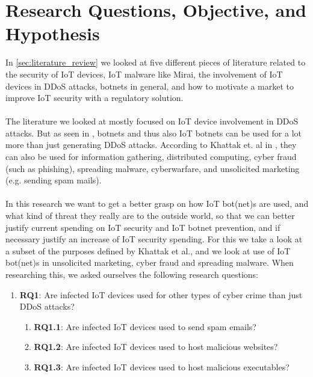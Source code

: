 \documentclass[a4paper,10pt]{article}
\begin{document}
\section{Research Questions, Objective, and Hypothesis} \label{sec:research_questions}
% 
In \autoref{sec:literature_review} we looked at five different pieces of literature related to the security of IoT 
devices, IoT malware like Mirai, the involvement of IoT devices in DDoS attacks, botnets in general, and how 
to motivate a market to improve IoT security with a regulatory solution.
\\\\
The literature we looked at mostly focused on IoT device involvement in DDoS attacks. But as seen in \cite{Khattak2014},
botnets and thus also IoT botnets can be used for a lot more than just generating DDoS attacks. According to Khattak et. al
in \cite{Khattak2014}, they can also be used for information gathering, distributed computing, cyber fraud (such as phishing),
spreading malware, cyberwarfare, and unsolicited marketing (e.g. sending spam mails).
\\\\
In this research we want to get a better grasp on how IoT bot(net)s are used, and what kind of threat they really are to the 
outside world, so that we can better justify current spending on IoT security and IoT botnet prevention, and if necessary 
justify an increase of IoT security spending. For this we take a look at a subset of the purposes defined by Khattak et al., and
we look at use of IoT bot(net)s in unsolicited marketing, cyber fraud and spreading malware. When researching this, we 
asked ourselves the following research questions:
\begin{enumerate}
 \item[] \textbf{RQ1}: Are infected IoT devices used for other types of cyber crime than just DDoS attacks? \label{rq1}
 \begin{enumerate}
  \item[] \textbf{RQ1.1}: Are infected IoT devices used to send spam emails? \label{rq11}
  \item[] \textbf{RQ1.2}: Are infected IoT devices used to host malicious websites? \label{rq12}
  \item[] \textbf{RQ1.3}: Are infected IoT devices used to host malicious executables? \label{rq13}
 \end{enumerate}
\end{enumerate}
\end{document}
